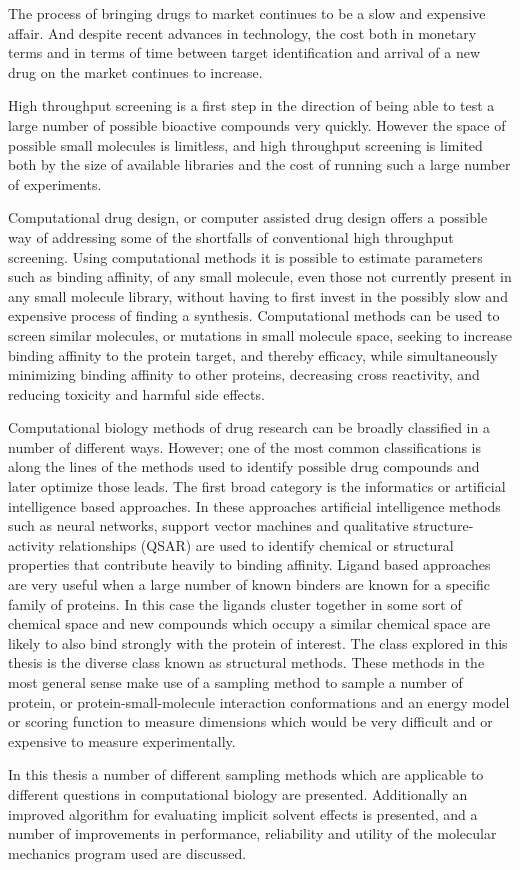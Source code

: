 The process of bringing drugs to market continues to be a slow and expensive affair.
And despite recent advances in technology, the cost both in monetary terms and in terms of time between target identification and arrival of a new drug on the market continues to increase.

High throughput screening is a first step in the direction of being able to test a large number of possible bioactive compounds very quickly.
However the space of possible small molecules is limitless, and high throughput screening is limited both by the size of available libraries and the cost of running such a large number of experiments.

Computational drug design, or computer assisted drug design offers a possible way of addressing some of the shortfalls of conventional high throughput screening.
Using computational methods it is possible to estimate parameters such as binding affinity, of any small molecule, even those not currently present in any small molecule library, without having to first invest in the possibly slow and expensive process of finding a synthesis.
Computational methods can be used to screen similar molecules, or mutations in small molecule space, seeking to increase binding affinity to the protein target, and thereby efficacy, while simultaneously minimizing binding affinity to other proteins, decreasing cross reactivity, and reducing toxicity and harmful side effects.

Computational biology methods of drug research can be broadly classified in a number of different ways.
However; one of the most common classifications is along the lines of the methods used to identify possible drug compounds and later optimize those leads.
The first broad category is the informatics or artificial intelligence based approaches.
In these approaches artificial intelligence methods such as neural networks, support vector machines and qualitative structure-activity relationships (QSAR) are used to identify chemical or structural properties that contribute heavily to binding affinity.
Ligand based approaches are very useful when a large number of known binders are known for a specific family of proteins.
In this case the ligands cluster together in some sort of chemical space and new compounds which occupy a similar chemical space are likely to also bind strongly with the protein of interest.
The class explored in this thesis is the diverse class known as structural methods.
These methods in the most general sense make use of a sampling method to sample a number of protein, or protein-small-molecule interaction conformations and an energy model or scoring function to measure dimensions which would be very difficult and or expensive to measure experimentally.

In this thesis a number of different sampling methods which are applicable to different questions in computational biology are presented.
Additionally an improved algorithm for evaluating implicit solvent effects is presented, and a number of improvements in performance, reliability and utility of the molecular mechanics program used are discussed.
